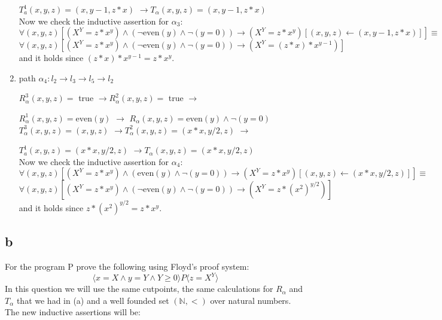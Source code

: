 \documentclass{article}
\begin{document}
\begin{enumerate}
$T_a^1(x, y, z)=(x,y-1,z*x)$ $\rightarrow
T_\alpha(x, y, z)=(x,y-1,z*x)$ \\

Now we check the inductive assertion for $\alpha_3$: \\
$\forall(x, y, z)\left[(X^Y=z*x^y) \wedge (\neg \text{even}(y) \wedge \neg (y=0)) \rightarrow\left(X^Y=z*x^y \right)[(x, y, z) \leftarrow(x,y-1,z*x)]\right] \equiv$ \\
$\forall(x, y, z)\left[(X^Y=z*x^y) \wedge (\neg \text{even}(y) \wedge \neg (y=0)) \rightarrow (X^Y=(z*x)*x^{y-1}) \right]$ and it holds since $(z*x)*x^{y-1}=z*x^y$.
\\


\item  path $\alpha_4: l_2 \rightarrow l_3 \rightarrow l_5 \rightarrow l_2$ 

$R_\alpha^3(x, y, z)=$ true $\rightarrow R_\alpha^2(x, y, z)=$ true $\rightarrow$ 

$R_\alpha^1(x, y, z)=  \text{even}(y)$ $\rightarrow$
$R_\alpha(x, y, z)= \text{even}(y) \wedge \neg (y=0)$ \\

$T_\alpha^3(x, y, z)=(x, y, z)$ $\rightarrow
T_\alpha^2(x,y,z)=(x*x, y/2, z)$ $\rightarrow$

$T_a^1(x, y, z)=(x*x, y/2, z)$ $\rightarrow
T_\alpha(x, y, z)=(x*x, y/2, z)$ \\

Now we check the inductive assertion for $\alpha_4$: \\
$\forall(x, y, z)\left[(X^Y=z*x^y) \wedge ( \text{even}(y) \wedge \neg (y=0)) \rightarrow (X^Y=z*x^y) [(x, y, z) \leftarrow(x*x, y/2, z)]\right] \equiv$ \\
$\forall(x, y, z)\left[(X^Y=z*x^y) \wedge (\neg \text{even}(y) \wedge \neg (y=0)) \rightarrow (X^Y=z*(x^2)^{y/2}) \right]$ and it holds since $z*(x^2)^{y/2}=z*x^y$.
\\
\end{enumerate}

\subsection*{b}

For the program P prove the following using Floyd's proof system:
$$
\langle x=X \wedge y=Y \wedge Y \geq 0\rangle P \langle z=X^Y\rangle
$$
In this question we will use the same cutpoints, the same calculations for $R_\alpha$ and $T_\alpha$ that we had in (a) and a well founded set $(\mathbb{N}, <)$ over natural numbers. The new inductive assertions will be:
\end{document}
